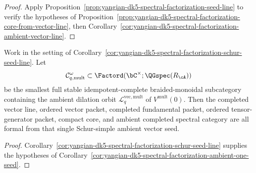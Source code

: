 \begin{proof}
Apply
Proposition~\ref{prop:yangian-dk5-spectral-factorization-seed-line}
to verify the hypotheses of
Proposition~\ref{prop:yangian-dk5-spectral-factorization-core-from-vector-line},
then
Corollary~\ref{cor:yangian-dk5-spectral-factorization-ambient-vector-line}.
\end{proof}

\begin{corollary}
\label{cor:yangian-dk5-spectral-factorization-ambient-schur-seed}
Work in the setting of
Corollary~\ref{cor:yangian-dk5-spectral-factorization-schur-seed-line}.
Let
\[
\mathcal C_{q,\mathrm{mult}}^\omega
\subset
\Factord(\bC^\times;\QGspec(R_{\cA}))
\]
be the smallest full stable idempotent-complete braided-monoidal
subcategory containing the ambient dilation orbit
\(\mathcal L_q^{\mathrm{vec,mult}}\) of \(V^{\mathrm{mult}}(0)\).
Then the completed vector line, ordered vector packet, completed
fundamental packet, ordered tensor-generator packet, compact core, and
ambient completed spectral category are all formal from that single
Schur-simple ambient vector seed.

\end{corollary}

\begin{proof}
Corollary~\ref{cor:yangian-dk5-spectral-factorization-schur-seed-line}
supplies the hypotheses of
Corollary~\ref{cor:yangian-dk5-spectral-factorization-ambient-one-seed}.
\end{proof}

